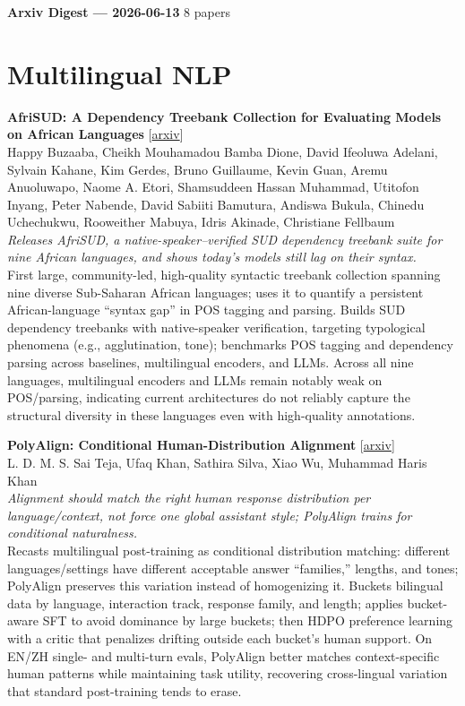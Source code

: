\documentclass[12pt,letterpaper]{article}
\begin{document}
{\footnotesize\textbf{Arxiv Digest --- 2026-06-13} \hfill 8 papers}

\smallskip

\section*{Multilingual NLP}

{\small\textbf{AfriSUD: A Dependency Treebank Collection for Evaluating Models on African Languages}} {\scriptsize[\href{https://arxiv.org/abs/2606.12708}{arxiv}]}\\
{\scriptsize Happy Buzaaba, Cheikh Mouhamadou Bamba Dione, David Ifeoluwa Adelani, Sylvain Kahane, Kim Gerdes, Bruno Guillaume, Kevin Guan, Aremu Anuoluwapo, Naome A. Etori, Shamsuddeen Hassan Muhammad, Utitofon Inyang, Peter Nabende, David Sabiiti Bamutura, Andiswa Bukula, Chinedu Uchechukwu, Rooweither Mabuya, Idris Akinade, Christiane Fellbaum}\\

{\small\textit{Releases AfriSUD, a native-speaker--verified SUD dependency treebank suite for nine African languages, and shows today's models still lag on their syntax.}}\\[1pt]
{\footnotesize First large, community-led, high-quality syntactic treebank collection spanning nine diverse Sub-Saharan African languages; uses it to quantify a persistent African-language ``syntax gap'' in POS tagging and parsing. Builds SUD dependency treebanks with native-speaker verification, targeting typological phenomena (e.g., agglutination, tone); benchmarks POS tagging and dependency parsing across baselines, multilingual encoders, and LLMs. Across all nine languages, multilingual encoders and LLMs remain notably weak on POS/parsing, indicating current architectures do not reliably capture the structural diversity in these languages even with high-quality annotations.}

\medskip

{\small\textbf{PolyAlign: Conditional Human-Distribution Alignment}} {\scriptsize[\href{https://arxiv.org/abs/2606.13227}{arxiv}]}\\
{\scriptsize L. D. M. S. Sai Teja, Ufaq Khan, Sathira Silva, Xiao Wu, Muhammad Haris Khan}\\

{\small\textit{Alignment should match the right human response distribution per language/context, not force one global assistant style; PolyAlign trains for conditional naturalness.}}\\[1pt]
{\footnotesize Recasts multilingual post-training as conditional distribution matching: different languages/settings have different acceptable answer ``families,'' lengths, and tones; PolyAlign preserves this variation instead of homogenizing it. Buckets bilingual data by language, interaction track, response family, and length; applies bucket-aware SFT to avoid dominance by large buckets; then HDPO preference learning with a critic that penalizes drifting outside each bucket's human support. On EN/ZH single- and multi-turn evals, PolyAlign better matches context-specific human patterns while maintaining task utility, recovering cross-lingual variation that standard post-training tends to erase.}
\end{document}
